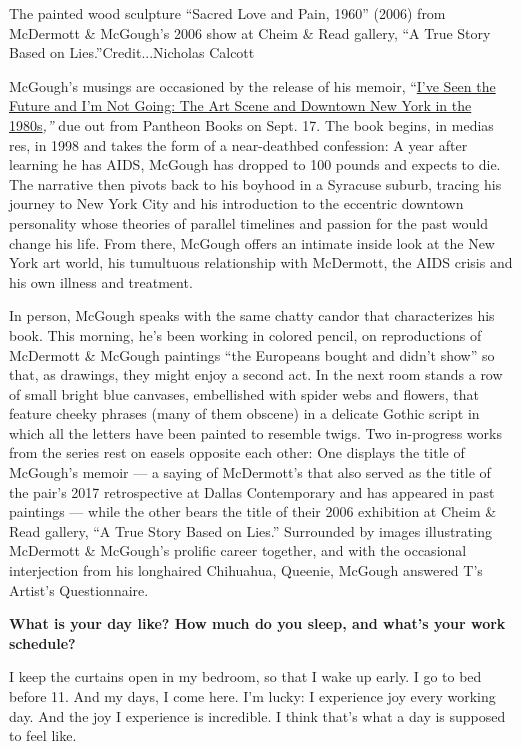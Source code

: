 The painted wood sculpture ``Sacred Love and Pain, 1960'' (2006) from
McDermott \& McGough's 2006 show at Cheim \& Read gallery, ``A True
Story Based on Lies.''Credit...Nicholas Calcott

McGough's musings are occasioned by the release of his memoir,
``\href{https://www.penguinrandomhouse.com/books/561291/ive-seen-the-future-and-im-not-going-by-peter-mcgough/9781524747046/}{I've
Seen the Future and I'm Not Going: The Art Scene and Downtown New York
in the 1980s}\emph{,''} due out from Pantheon Books on Sept. 17. The
book begins, in medias res, in 1998 and takes the form of a
near-deathbed confession: A year after learning he has AIDS, McGough has
dropped to 100 pounds and expects to die. The narrative then pivots back
to his boyhood in a Syracuse suburb, tracing his journey to New York
City and his introduction to the eccentric downtown personality whose
theories of parallel timelines and passion for the past would change his
life. From there, McGough offers an intimate inside look at the New York
art world, his tumultuous relationship with McDermott, the AIDS crisis
and his own illness and treatment.

In person, McGough speaks with the same chatty candor that characterizes
his book. This morning, he's been working in colored pencil, on
reproductions of McDermott \& McGough paintings ``the Europeans bought
and didn't show'' so that, as drawings, they might enjoy a second act.
In the next room stands a row of small bright blue canvases, embellished
with spider webs and flowers, that feature cheeky phrases (many of them
obscene) in a delicate Gothic script in which all the letters have been
painted to resemble twigs. Two in-progress works from the series rest on
easels opposite each other: One displays the title of McGough's memoir
--- a saying of McDermott's that also served as the title of the pair's
2017 retrospective at Dallas Contemporary and has appeared in past
paintings --- while the other bears the title of their 2006 exhibition
at Cheim \& Read gallery, ``A True Story Based on Lies.'' Surrounded by
images illustrating McDermott \& McGough's prolific career together, and
with the occasional interjection from his longhaired Chihuahua, Queenie,
McGough answered T's Artist's Questionnaire.

\textbf{What is your day like? How much do you sleep, and what's your
work schedule?}

I keep the curtains open in my bedroom, so that I wake up early. I go to
bed before 11. And my days, I come here. I'm lucky: I experience joy
every working day. And the joy I experience is incredible. I think
that's what a day is supposed to feel like.

